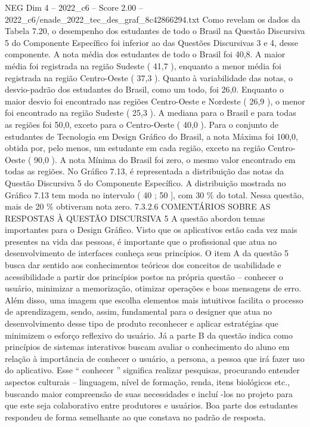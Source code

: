 \begin{textsample}{NEG Dim 4 – 2022\_c6 – Score 2.00 – 2022\_c6/enade\_2022\_tec\_des\_graf\_8c42866294.txt}
Como revelam os dados da Tabela 7.20, o desempenho dos estudantes de todo o Brasil na Questão Discursiva 5 do Componente Específico foi inferior ao das Questões Discursivas 3 e 4, desse componente.
A nota média dos estudantes de todo o Brasil foi 40,8.
A maior média foi registrada na região Sudeste ( 41,7 ), enquanto a menor média foi registrada na região Centro-Oeste ( 37,3 ).
Quanto à variabilidade das notas, o desvio-padrão dos estudantes do Brasil, como um todo, foi 26,0.
Enquanto o maior desvio foi encontrado nas regiões Centro-Oeste e Nordeste ( 26,9 ), o menor foi encontrado na região Sudeste ( 25,3 ).
A mediana para o Brasil e para todas as regiões foi 50,0, exceto para o Centro-Oeste ( 40,0 ).
Para o conjunto de estudantes de Tecnologia em Design Gráfico do Brasil, a nota Máxima foi 100,0, obtida por, pelo menos, um estudante em cada região, exceto na região Centro-Oeste ( 90,0 ).
A nota Mínima do Brasil foi zero, o mesmo valor encontrado em todas as regiões.
No Gráfico 7.13, é representada a distribuição das notas da Questão Discursiva 5 do Componente Específico.
A distribuição mostrada no Gráfico 7.13 tem moda no intervalo ( 40 ; 50 ], com 30 \% do total.
Nessa questão, mais de 20 \% obtiveram nota zero. 7.3.2.6 COMENTÁRIOS SOBRE AS RESPOSTAS À QUESTÃO DISCURSIVA 5 A questão abordou temas importantes para o Design Gráfico.
Visto que os aplicativos estão cada vez mais presentes na vida das pessoas, é importante que o profissional que atua no desenvolvimento de interfaces conheça seus princípios.
O item A da questão 5 busca dar sentido aos conhecimentos teóricos dos conceitos de usabilidade e acessibilidade a partir dos princípios postos na própria questão – conhecer o usuário, minimizar a memorização, otimizar operações e boas mensagens de erro.
Além disso, uma imagem que escolha elementos mais intuitivos facilita o processo de aprendizagem, sendo, assim, fundamental para o designer que atua no desenvolvimento desse tipo de produto reconhecer e aplicar estratégias que minimizem o esforço reflexivo do usuário.
Já a parte B da questão indica como princípios de sistemas interativos buscam avaliar o conhecimento do aluno em relação à importância de conhecer o usuário, a persona, a pessoa que irá fazer uso do aplicativo.
Esse “ conhecer ” significa realizar pesquisas, procurando entender aspectos culturais – linguagem, nível de formação, renda, itens biológicos etc., buscando maior compreensão de suas necessidades e incluí -los no projeto para que este seja colaborativo entre produtores e usuários.
Boa parte dos estudantes respondeu de forma semelhante ao que constava no padrão de resposta.

\end{textsample}
